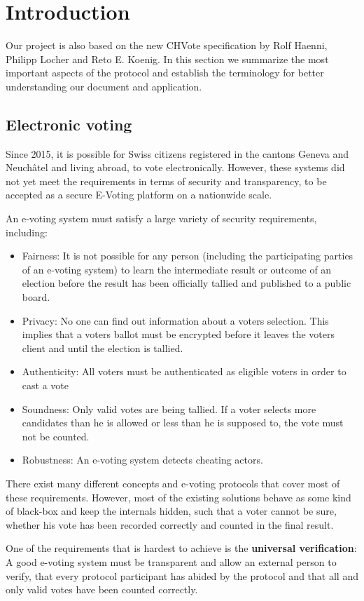 \chapter{Introduction}
Our project is also based on the new CHVote specification by Rolf Haenni, Philipp Locher and Reto E. Koenig. In this section we summarize the most important aspects of the protocol and establish the terminology for better understanding our document and application.
\section{Electronic voting}
Since 2015, it is possible for Swiss citizens registered in the cantons Geneva and Neuchâtel and living abroad, to vote electronically. However, these systems did not yet meet the requirements in terms of security and transparency, to be accepted as a secure E-Voting platform on a nationwide scale.

An e-voting system must satisfy a large variety of security requirements, including:

\begin{itemize}
	\item Fairness: It is not possible for any person (including the participating parties of an e-voting system) to learn the intermediate result or outcome of an election before the result has been officially tallied and published to a public board.  
	\item Privacy: No one can find out information about a voters selection. This implies that a voters ballot must be encrypted before it leaves the voters client and until the election is tallied.
	\item Authenticity: All voters must be authenticated as eligible voters in order to cast a vote
	\item Soundness: Only valid votes are being tallied. If a voter selects more candidates than he is allowed or less than he is supposed to, the vote must not be counted.
 \item Robustness: An e-voting system detects cheating actors.
\end{itemize}

There exist many different concepts and e-voting protocols that cover most of these requirements. However, most of the existing solutions behave as some kind of black-box and keep the internals hidden, such that a voter cannot be sure, whether his vote has been recorded correctly and counted in the final result. 

One of the requirements that is hardest to achieve is the \textbf{universal verification}: A good e-voting system must be transparent and allow an external person to verify, that every protocol participant has abided by the protocol and that all and only valid votes have been counted correctly.

